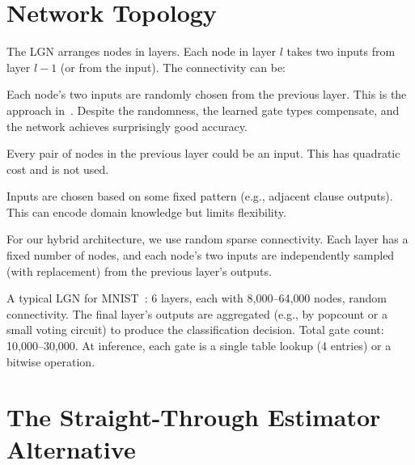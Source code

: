 \section{Network Topology}
\label{sec:lgn-topology}

The LGN arranges nodes in layers. Each node in layer $l$ takes two
inputs from layer $l-1$ (or from the input). The connectivity can be:

\begin{description}[leftmargin=1em]
  \item[Random sparse:] Each node's two inputs are randomly chosen
    from the previous layer. This is the approach
    in~\cite{petersen2022difflogic}. Despite the randomness, the
    learned gate types compensate, and the network achieves
    surprisingly good accuracy.

  \item[Fully connected (impractical):] Every pair of nodes in the
    previous layer could be an input. This has quadratic cost and is
    not used.

  \item[Structured:] Inputs are chosen based on some fixed pattern
    (e.g., adjacent clause outputs). This can encode domain knowledge
    but limits flexibility.
\end{description}

For our hybrid architecture, we use random sparse connectivity.
Each layer has a fixed number of nodes, and each node's two inputs
are independently sampled (with replacement) from the previous layer's
outputs.

\begin{engineernote}
A typical LGN for MNIST~\cite{petersen2022difflogic}: 6 layers, each with 8{,}000--64{,}000 nodes,
random connectivity. The final layer's outputs are aggregated
(e.g., by popcount or a small voting circuit) to produce the
classification decision. Total gate count: 10,000--30,000.
At inference, each gate is a single table lookup (4 entries) or a
bitwise operation.
\end{engineernote}


\section{The Straight-Through Estimator Alternative}
\label{sec:ste}

